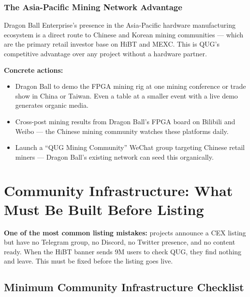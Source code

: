 \documentclass[11pt,a4paper]{article}
\begin{document}
\subsubsection{The Asia-Pacific Mining Network Advantage}

Dragon Ball Enterprise's presence in the Asia-Pacific hardware manufacturing ecosystem is a direct route to Chinese and Korean mining communities — which are the primary retail investor base on HiBT and MEXC. This is QUG's competitive advantage over any project without a hardware partner.

\textbf{Concrete actions:}
\begin{itemize}[leftmargin=1.5em]
  \item Dragon Ball to demo the FPGA mining rig at one mining conference or trade show in China or Taiwan. Even a table at a smaller event with a live demo generates organic media.
  \item Cross-post mining results from Dragon Ball's FPGA board on Bilibili and Weibo — the Chinese mining community watches these platforms daily.
  \item Launch a ``QUG Mining Community'' WeChat group targeting Chinese retail miners — Dragon Ball's existing network can seed this organically.
\end{itemize}

\section{Community Infrastructure: What Must Be Built Before Listing}

\begin{redbox}
\textbf{One of the most common listing mistakes:} projects announce a CEX listing but have no Telegram group, no Discord, no Twitter presence, and no content ready. When the HiBT banner sends 9M users to check QUG, they find nothing and leave. This must be fixed before the listing goes live.
\end{redbox}

\subsection{Minimum Community Infrastructure Checklist}
\end{document}
